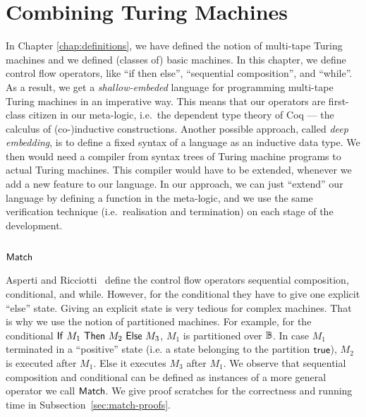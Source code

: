 \chapter{Combining Turing Machines}
\label{chap:combining}

In Chapter \ref{chap:definitions}, we have defined the notion of multi-tape Turing machines and we defined (classes of) basic machines.  In this
chapter, we define control flow operators, like ``if then else'', ``sequential composition'', and ``while''.  As a result, we get a
\textit{shallow-embeded} language for programming multi-tape Turing machines in an imperative way.  This means that our operators are first-class
citizen in our meta-logic, i.e.\ the dependent type theory of Coq --- the calculus of (co-)inductive constructions.  Another possible approach, called
\textit{deep embedding}, is to define a fixed syntax of a language as an inductive data type.  We then would need a compiler from syntax trees of
Turing machine programs to actual Turing machines.  This compiler would have to be extended, whenever we add a new feature to our language.  In our
approach, we can just ``extend'' our language by defining a function in the meta-logic, and we use the same verification technique (i.e.\ realisation
and termination) on each stage of the development.


\section{$\mathsf{Match}$}
\label{sec:match}


Asperti and Ricciotti~\cite{asperti2015} define the control flow operators sequential composition, conditional, and while.  However, for the
conditional they have to give one explicit ``else'' state.  Giving an explicit state is very tedious for complex machines.  That is why we use the
notion of partitioned machines.  For example, for the conditional $\mathsf{If}~M_1~\mathsf{Then}~M_2~\mathsf{Else}~M_3$, $M_1$ is partitioned over $\mathbb{B}$.  In case $M_1$ terminated
in a ``positive'' state (i.e. a state belonging to the partition $\mathsf{true}$), $M_2$ is executed after $M_1$.  Else it executes $M_3$ after $M_1$.  We
observe that sequential composition and conditional can be defined as instances of a more general operator we call $\mathsf{Match}$.  We give proof
scratches for the correctness and running time in Subsection~\ref{sec:match-proofs}.

